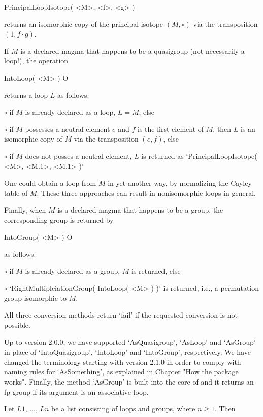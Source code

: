 \>PrincipalLoopIsotope( <M>, <f>, <g> )

returns an isomorphic copy of the principal isotope $(M,\circ)$ via the
transposition $(1,f\cdot g)$.

If $M$ is a declared magma that happens to be a quasigroup (not necessarily a
loop!), the operation

\>IntoLoop( <M> ) O

returns a loop $L$ as follows:
\beginlist%
\item{$\circ$} if $M$ is already declared as a loop, $L=M$, else
\item{$\circ$}
    if $M$ possesses a neutral element $e$ and $f$ is the first element of $M$,
    then $L$ is an isomorphic copy of $M$ via the transposition $(e,f)$, else
\item{$\circ$}
    if $M$ does not posses a neutral element, $L$ is returned as
    `PrincipalLoopIsotope( <M>, <M.1>, <M.1> )'
\endlist

One could obtain a loop from $M$ in yet another way, by normalizing the Cayley
table of $M$. These three approaches can result in nonisomorphic loops in
general.

Finally, when $M$ is a declared magma that happens to be a group, the
corresponding group is returned by

\>IntoGroup( <M> ) O

as follows:
\beginlist%
\item{$\circ$} if $M$ is already declared as a group, $M$ is returned, else
\item{$\circ$} `RightMultiplciationGroup( IntoLoop( <M> ) )' is returned, i.e.,
    a permutation group isomorphic to $M$.
\endlist

All three conversion methods return `fail' if the requested conversion is not
possible.

Up to version 2.0.0, we have supported `AsQuasigroup', `AsLoop' and `AsGroup'
in place of `IntoQuasigroup', `IntoLoop' and `IntoGroup', respectively. We have
changed the terminology starting with version 2.1.0 in order to comply with
{\GAP} naming rules for `AsSomething', as explained in Chapter "How the package
works". Finally, the method `AsGroup' is built into the core of {\GAP} and it
returns an fp group if its argument is an associative loop.


\noindent Let $L1$, $\dots$, $Ln$ be a list consisting of loops and groups,
where $n\ge 1$. Then

